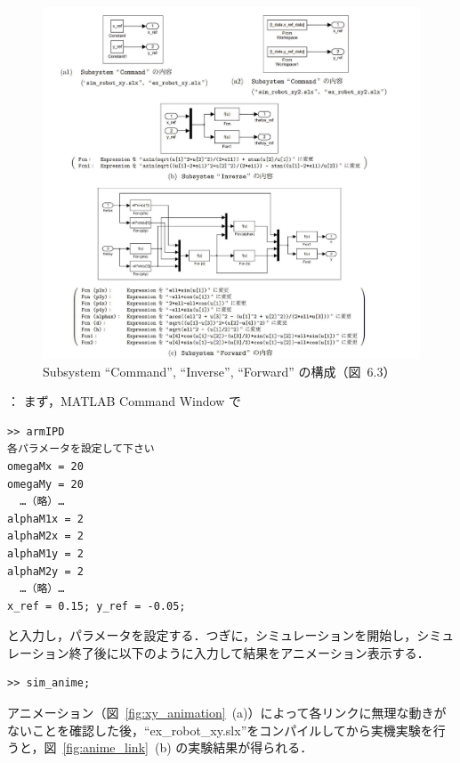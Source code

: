 \begin{figure}[H]
    \centering
    \includegraphics[width=1.0\linewidth]{figure/subsystem_all.pdf}
    \caption{Subsystem ``Command'', ``Inverse'', ``Forward'' の構成（図~6.3）}
    \label{fig:subsystems}
\end{figure}

： まず，MATLAB Command Window で
\begin{verbatim}
>> armIPD
各パラメータを設定して下さい
omegaMx = 20
omegaMy = 20
  …（略）…
alphaM1x = 2
alphaM2x = 2
alphaM1y = 2
alphaM2y = 2
  …（略）…
x_ref = 0.15; y_ref = -0.05;
\end{verbatim}

と入力し，パラメータを設定する．つぎに，シミュレーションを開始し，シミュレーション終了後に以下のように入力して結果をアニメーション表示する．
\begin{verbatim}
>> sim_anime;
\end{verbatim}

アニメーション（図~\ref{fig:xy_animation}~(a)）によって各リンクに無理な動きがないことを確認した後，``ex\_robot\_xy.slx''をコンパイルしてから実機実験を行うと，図~\ref{fig:anime_link}~(b) の実験結果が得られる．


